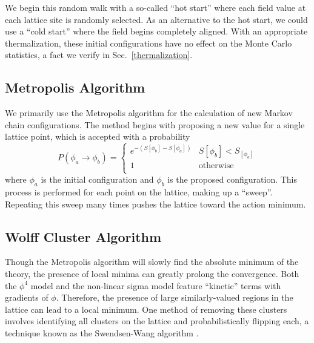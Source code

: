 We begin this random walk with a so-called ``hot start'' where each field value at each lattice site is randomly selected. As an alternative to the hot start, we could use a ``cold start'' where the field begins completely aligned. With an appropriate thermalization, these initial configurations have no effect on the Monte Carlo statistics, a fact we verify in Sec.~\ref{thermalization}. 

\subsection{Metropolis Algorithm}
We primarily use the Metropolis algorithm for the calculation of new Markov chain configurations. The method begins with proposing a new value for a single lattice point, which is accepted with a probability
\begin{equation}
    P(\phi_a\rightarrow\phi_b) = \begin{cases} 
        e^{-(S[\phi_b] - S[\phi_a])} & S[\phi_b] < S_[\phi_a] \\
        1 & \mathrm{otherwise} \\
   \end{cases}
\end{equation}
where $\phi_a$ is the initial configuration and $\phi_b$ is the proposed configuration. This process is performed for each point on the lattice, making up a ``sweep''. Repeating this sweep many times pushes the lattice toward the action minimum.


\subsection{Wolff Cluster Algorithm}
Though the Metropolis algorithm will slowly find the absolute minimum of the theory, the presence of local minima can greatly prolong the convergence. Both the $\phi^4$ model and the non-linear sigma model feature ``kinetic'' terms with gradients of $\phi$. Therefore, the presence of large similarly-valued regions in the lattice can lead to a local minimum. One method of removing these clusters involves identifying all clusters on the lattice and probabilistically flipping each, a technique known as the Swendsen-Wang algorithm \cite{swendsen1987}. 

